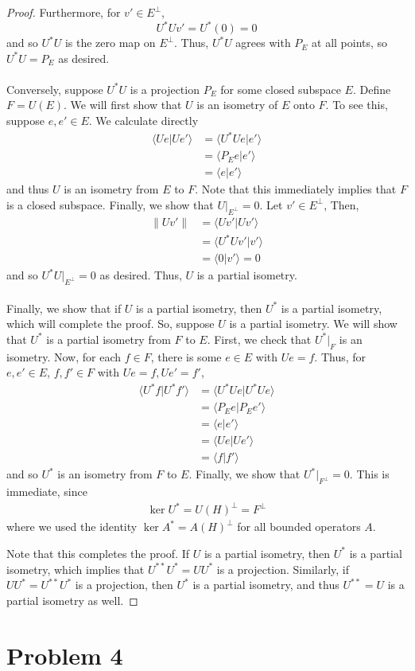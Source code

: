 \documentclass[fontsize=11pt]{scrartcl} %
\numberwithin{equation}{section} %
\numberwithin{figure}{section} %
\numberwithin{table}{section} %
\begin{document}
\begin{proof}
    Furthermore, for $v'\in E^{\perp}$,
    \[
        U^*Uv'=U^*(0) = 0
    \]
    and so $U^*U$ is the zero map on $E^{\perp}$. Thus, $U^*U$ agrees with $P_E$
    at all points, so $U^*U=P_E$ as desired.
    \\
    \\
    Conversely, suppose $U^*U$ is a projection $P_E$ for some closed subspace
    $E$. Define $F=U(E)$. We will first show that $U$ is an isometry of $E$ onto
    $F$. To see this, suppose $e,e'\in E$. We calculate directly
    \[
\begin{aligned}
    \langle Ue|Ue'\rangle &= \langle U^*Ue|e'\rangle\\
    &=\langle P_Ee|e'\rangle\\
    &=\langle e|e'\rangle
\end{aligned}
    \]
    and thus $U$ is an isometry from $E$ to $F$. Note that this immediately
    implies that $F$ is a closed subspace. Finally, we show that
    $U|_{E^{\perp}}=0$. Let $v'\in E^{\perp}$, Then,
    \[
\begin{aligned}
    \|Uv'\| &=\langle Uv'|Uv'\rangle\\
    &=\langle U^*Uv'|v'\rangle\\
    &=\langle 0|v'\rangle = 0
\end{aligned}
    \]
    and so $U^*U|_{E^{\perp}}=0$ as desired. Thus, $U$ is a partial isometry.
    \\
    \\
    Finally, we show that if $U$ is a partial isometry, then $U^*$ is a partial
    isometry, which will complete the proof. So, suppose $U$ is a partial
    isometry. We will show that $U^*$ is a partial isometry from $F$ to $E$.
    First, we check that $U^*|_F$ is an isometry. Now, for each $f\in F$, there
    is some $e\in E$ with $Ue=f$. Thus, for $e,e'\in E$, $f,f'\in F$ with
    $Ue=f,Ue'=f'$,
    \[
        \begin{aligned}
            \langle U^*f|U^*f'\rangle &= \langle U^*Ue|U^*Ue\rangle\\
            &=\langle P_Ee|P_Ee'\rangle\\
            &=\langle e|e'\rangle\\
            &=\langle Ue|Ue'\rangle\\
            &=\langle f|f'\rangle
        \end{aligned}
    \]
    and so $U^*$ is an isometry from $F$ to $E$.
    Finally, we show that $U^*|_{F^{\perp}}=0$. This is immediate, since
    \[
        \begin{aligned}
            \ker U^* = U(H)^{\perp} = F^{\perp}
        \end{aligned}
    \]
    where we used the identity $\ker A^* = A(H)^{\perp}$ for all bounded
    operators $A$. 

    Note that this completes the proof. If $U$ is a partial isometry, then $U^*$
    is a partial isometry, which implies that $U^{**}U^*=UU^*$ is a projection.
    Similarly, if $UU^*=U^{**}U^*$ is a projection, then $U^*$ is a partial
    isometry, and thus $U^{**}=U$ is a partial isometry as well.
\end{proof}

\newpage

\section*{Problem 4}
\end{document}
